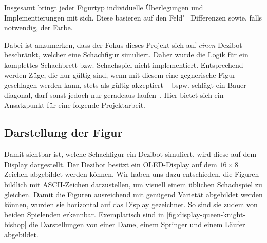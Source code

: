 
Insgesamt bringt jeder Figurtyp individuelle Überlegungen und Implementierungen mit sich. Diese basieren auf den Feld"=Differenzen sowie, falls notwendig, der Farbe.


Dabei ist anzumerken, dass der Fokus dieses Projekt sich auf \emph{einen} Dezibot beschränkt, welcher eine Schachfigur simuliert. Daher wurde die Logik für ein komplettes Schachbrett bzw. Schachspiel nicht implementiert. Entsprechend werden Züge, die nur gültig sind, wenn mit diesem eine gegnerische Figur geschlagen werden kann, stets als gültig akzeptiert -- bspw. schlägt ein Bauer diagonal, darf sonst jedoch nur geradeaus laufen~\cite{justUSChessFederations2019}. Hier bietet sich ein Ansatzpunkt für eine folgende Projektarbeit.


\subsection{Darstellung der Figur}
\label{sec:display-representation}

Damit sichtbar ist, welche Schachfigur ein Dezibot simuliert, wird diese auf dem Display dargestellt. Der Dezibot besitzt ein OLED-Display auf dem $16 \times 8$ Zeichen abgebildet werden können. Wir haben uns dazu entschieden, die Figuren bildlich mit ASCII-Zeichen darzustellen, um visuell einem üblichen Schachspiel zu gleichen. Damit die Figuren ausreichend mit genügend Varietät abgebildet werden können, wurden sie horizontal auf das Display gezeichnet. So sind sie zudem von beiden Spielenden erkennbar. Exemplarisch sind in \autoref{fig:display-queen-knight-bishop} die Darstellungen von einer Dame, einem Springer und einem Läufer abgebildet.

